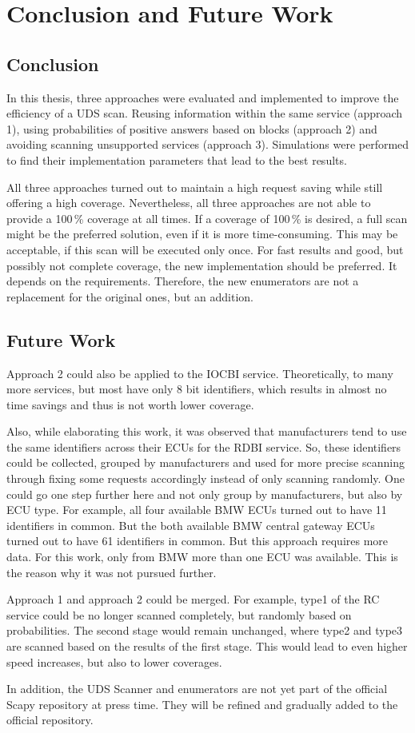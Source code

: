 \chapter{Conclusion and Future Work}

\section{Conclusion}

In this thesis, three approaches were evaluated and implemented to improve the efficiency of a UDS scan. Reusing information within the same service (approach 1), using probabilities of positive answers based on blocks (approach 2) and avoiding scanning unsupported services (approach 3). Simulations were performed to find their implementation parameters that lead to the best results.

All three approaches turned out to maintain a high request saving while still offering a high coverage.
Nevertheless, all three approaches are not able to provide a 100\,\% coverage at all times. 
If a coverage of 100\,\% is desired, a full scan might be the preferred solution, even if it is more time-consuming. This may be acceptable, if this scan will be executed only once. For fast results and good, but possibly not complete coverage, the new implementation should be preferred. It depends on the requirements. Therefore, the new enumerators are not a replacement for the original ones, but an addition.

\section{Future Work}

Approach 2 could also be applied to the IOCBI service. Theoretically, to many more services, but most have only 8 bit identifiers, which results in almost no time savings and thus is not worth lower coverage.

Also, while elaborating this work, it was observed that manufacturers tend to use the same identifiers across their ECUs for the RDBI service. So, these identifiers could be collected, grouped by manufacturers and used for more precise scanning through fixing some requests accordingly instead of only scanning randomly. One could go one step further here and not only group by manufacturers, but also by ECU type.
For example, all four available BMW ECUs turned out to have 11 identifiers in common. But the both available BMW central gateway ECUs turned out to have 61 identifiers in common. But this approach requires more data. For this work, only from BMW more than one ECU was available. This is the reason why it was not pursued further.

Approach 1 and approach 2 could be merged. For example, type1 of the RC service could be no longer scanned completely, but randomly based on probabilities. The second stage would remain unchanged, where type2 and type3 are scanned based on the results of the first stage. This would lead to even higher speed increases, but also to lower coverages.

In addition, the UDS Scanner and enumerators are not yet part of the official Scapy repository at press time. They will be refined and gradually added to the official repository.
